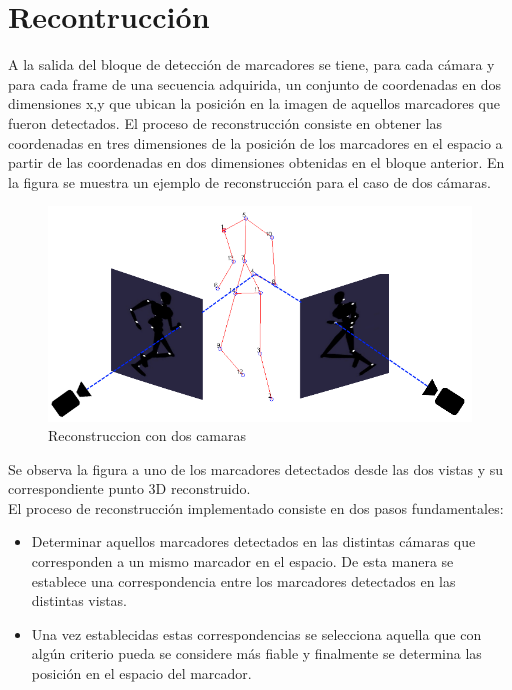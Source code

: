 
\section{Recontrucción}

A la salida del bloque de detección de marcadores se tiene,  para cada cámara y para cada frame de una secuencia adquirida, un conjunto de coordenadas en dos dimensiones x,y que ubican la posición en la imagen de aquellos marcadores que fueron detectados. 
El proceso de reconstrucción consiste en obtener las coordenadas en tres dimensiones de la posición de los marcadores en el espacio a partir de  las coordenadas en dos dimensiones obtenidas en el bloque anterior.
En la figura se muestra un ejemplo de reconstrucción para el caso de dos cámaras.\\


\begin{figure}[h!]
\begin{center}
\includegraphics[scale=0.2]{img/Reconstruccion/reconstruccion2.png}
\end{center}
\caption{Reconstruccion con dos camaras}
\label{pinhole_camara}
\end{figure}


Se observa la figura a uno de los marcadores detectados desde las dos vistas y su correspondiente punto 3D reconstruido.\\

El proceso de reconstrucción implementado consiste en dos pasos fundamentales:
\begin{itemize}
\item Determinar  aquellos marcadores detectados en las distintas cámaras que corresponden a un mismo marcador en el espacio. De esta manera se establece una correspondencia entre los marcadores detectados en las distintas vistas.\\
\item Una vez establecidas estas correspondencias se selecciona aquella que con algún criterio pueda se considere más fiable y finalmente se determina las posición en el espacio del marcador.\\

\end{itemize}


